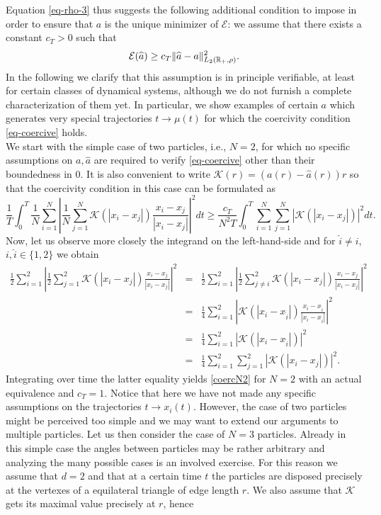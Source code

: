 Equation \eqref{eq-rho-3} thus suggests the following additional condition to impose in order to ensure that $a$ is the unique minimizer of $\mathcal E$: we assume that there exists a constant $c_T>0$ such that
\begin{align}\label{eq-coercive}
	\mathcal E(\widehat a)\geq c_T\|\widehat a-a\|^2_{L_2(\mathbb{R}_+,\rho)}.
\end{align}
In the following we clarify that this assumption is in principle verifiable, at least for certain classes of dynamical systems, although we do not furnish a complete characterization of them yet. In particular, we show examples of certain $a$ which generates very special trajectories $t \to \mu(t)$ for which the  coercivity condition \eqref{eq-coercive} holds.\\
We start with the simple case of two particles, i.e., $N=2$, for which no specific assumptions on $a,\widehat a$ are required to verify \eqref{eq-coercive} other than their boundedness in $0$. It is also convenient to write $\mathcal K(r) = (a(r) - \widehat a(r)) r$ so that the coercivity condition in this case can be formulated as 
\begin{equation}\label{coercN2}
\frac{1}{T} \int_0^T \frac{1}{N} \sum_{i=1}^N \left | \frac{1}{N} \sum_{j=1}^N \mathcal K(|x_i-x_j|) \frac{x_i-x_j}{|x_i-x_j|} \right |^2 dt \geq \frac{c_T}{N^2T} \int_0^T  \sum_{i=1}^N \sum_{j=1}^N |\mathcal K(|x_i-x_j|)|^2  dt.
\end{equation}
Now, let us observe more closely the integrand on the left-hand-side and for $\widehat i \neq i$, $i,  \widehat i \in \{1,2\}$ we obtain
\begin{eqnarray*}
\frac{1}{2} \sum_{i=1}^2 \left | \frac{1}{2} \sum_{j=1}^2 \mathcal K(|x_i-x_j|) \frac{x_i-x_j}{|x_i-x_j|} \right |^2 &=& \frac{1}{2} \sum_{i=1}^2 \left | \frac{1}{2} \sum_{j\neq i}^2 \mathcal K(|x_i-x_j|) \frac{x_i-x_j}{|x_i-x_j|} \right |^2 \\
&=&  \frac{1}{4} \sum_{i=1}^2 \left |  \mathcal K(|x_i-x_{\widehat i}|) \frac{x_i-x_{\widehat i}}{|x_i-x_{\widehat i}|} \right |^2\\
&=& \frac{1}{4} \sum_{i=1}^2 \left |  \mathcal K(|x_i-x_{\widehat i}|) \right |^2\\
&=&\frac{1}{4}  \sum_{i=1}^2 \sum_{j=1}^2 |\mathcal K(|x_i-x_j|)|^2.
\end{eqnarray*}
Integrating over time the latter equality yields \eqref{coercN2} for $N=2$ with an actual equivalence and $c_T=1$. Notice that here we have not made any specific assumptions on the trajectories $t \to x_i(t)$. However, the case of two particles might be perceived too simple and we may want to extend our arguments to multiple particles. Let us then consider the case of $N=3$ particles. Already in this simple case the angles between particles may be rather arbitrary and analyzing the many possible cases is an involved exercise. For this reason we assume that $d=2$  and that at a certain time $t$ the particles are disposed precisely at the vertexes of a equilateral triangle of edge length $r$. We also assume that $\mathcal K$ gets its maximal value precisely at $r$, hence
